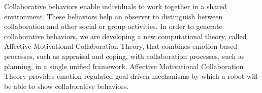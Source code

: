 \documentclass[letterpaper]{article}
\begin{document}
Collaborative behaviors enable individuals to work together in a shared
environment. These behaviors help an observer to distinguish between
collaboration and other social or group activities. In order to generate
collaborative behaviors, we are developing a new computational theory, called
Affective Motivational Collaboration Theory, that combines emotion-based
processes, such as appraisal and coping, with collaboration processes, such as
planning, in a single unified framework. Affective Motivational Collaboration
Theory provides emotion-regulated goal-driven mechanisms by which a robot will
be able to show collaborative behaviors.



\end{document}
